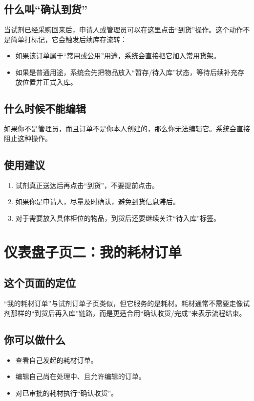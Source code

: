 \documentclass[12pt,a4paper]{ctexart}
\begin{document}
\subsection{什么叫“确认到货”}
当试剂已经采购回来后，申请人或管理员可以在这里点击“到货”操作。这个动作不是简单打标记，它会触发后续库存流转：
\begin{itemize}
  \item 如果该订单属于“常用或公用”用途，系统会直接把它加入常用货架。
  \item 如果是普通用途，系统会先把物品放入“暂存/待入库”状态，等待后续补充存放位置并正式入库。
\end{itemize}

\subsection{什么时候不能编辑}
如果你不是管理员，而且订单不是你本人创建的，那么你无法编辑它。系统会直接阻止这种操作。

\subsection{使用建议}
\begin{enumerate}
  \item 试剂真正送达后再点击“到货”，不要提前点击。
  \item 如果你是申请人，尽量及时确认，避免到货信息滞后。
  \item 对于需要放入具体柜位的物品，到货后还要继续关注“待入库”标签。
\end{enumerate}

\newpage
\section{仪表盘子页二：我的耗材订单}

\subsection{这个页面的定位}
“我的耗材订单”与试剂订单子页类似，但它服务的是耗材。耗材通常不需要走像试剂那样的“到货后再入库”链路，而是更适合用“确认收货/完成”来表示流程结束。

\subsection{你可以做什么}
\begin{itemize}
  \item 查看自己发起的耗材订单。
  \item 编辑自己尚在处理中、且允许编辑的订单。
  \item 对已审批的耗材执行“确认收货”。
\end{itemize}
\end{document}

